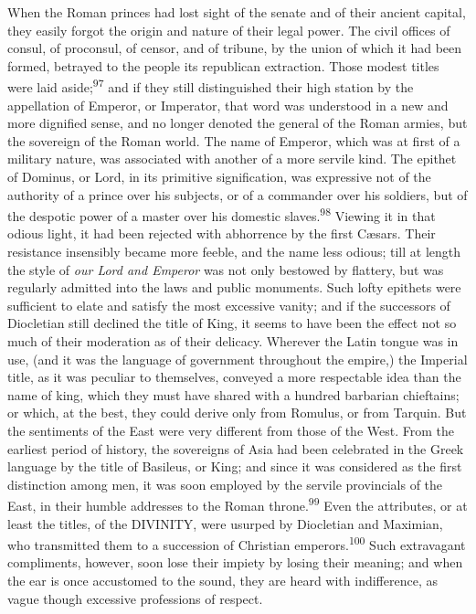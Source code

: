When the Roman princes had lost sight of the senate and of their
ancient capital, they easily forgot the origin and nature of
their legal power. The civil offices of consul, of proconsul, of
censor, and of tribune, by the union of which it had been formed,
betrayed to the people its republican extraction. Those modest
titles were laid aside;\textsuperscript{97} and if they still distinguished their
high station by the appellation of Emperor, or Imperator, that
word was understood in a new and more dignified sense, and no
longer denoted the general of the Roman armies, but the sovereign
of the Roman world. The name of Emperor, which was at first of a
military nature, was associated with another of a more servile
kind. The epithet of Dominus, or Lord, in its primitive
signification, was expressive not of the authority of a prince
over his subjects, or of a commander over his soldiers, but of
the despotic power of a master over his domestic slaves.\textsuperscript{98}
Viewing it in that odious light, it had been rejected with
abhorrence by the first Cæsars. Their resistance insensibly
became more feeble, and the name less odious; till at length the
style of \textit{our Lord and Emperor} was not only bestowed by
flattery, but was regularly admitted into the laws and public
monuments. Such lofty epithets were sufficient to elate and
satisfy the most excessive vanity; and if the successors of
Diocletian still declined the title of King, it seems to have
been the effect not so much of their moderation as of their
delicacy. Wherever the Latin tongue was in use, (and it was the
language of government throughout the empire,) the Imperial
title, as it was peculiar to themselves, conveyed a more
respectable idea than the name of king, which they must have
shared with a hundred barbarian chieftains; or which, at the
best, they could derive only from Romulus, or from Tarquin. But
the sentiments of the East were very different from those of the
West. From the earliest period of history, the sovereigns of Asia
had been celebrated in the Greek language by the title of
Basileus, or King; and since it was considered as the first
distinction among men, it was soon employed by the servile
provincials of the East, in their humble addresses to the Roman
throne.\textsuperscript{99} Even the attributes, or at least the titles, of the
DIVINITY, were usurped by Diocletian and Maximian, who
transmitted them to a succession of Christian emperors.\textsuperscript{100} Such
extravagant compliments, however, soon lose their impiety by
losing their meaning; and when the ear is once accustomed to the
sound, they are heard with indifference, as vague though
excessive professions of respect.

